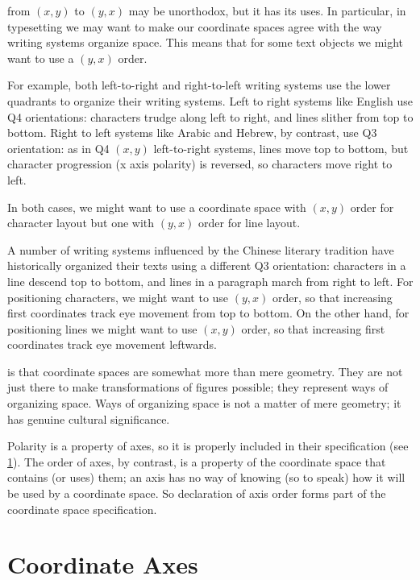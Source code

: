 \documentclass{tufte-handout}
\numberwithin{equation}{subsection}
\newcommand\cspace{coordinate space}
\begin{document}
 from \((x,y)\) to \((y,x)\) may
be unorthodox, but it has its uses.  In particular, in typesetting we
may want to make our \cspace{}s agree with the way writing systems
organize space.  This means that for some text objects we might want
to use a \((y,x)\) order.

For example, both left-to-right and right-to-left writing systems use
the lower quadrants to organize their writing systems.  Left to right
systems like English use Q4 orientations: characters trudge along left
to right, and lines slither from top to bottom.  Right to left systems
like Arabic and Hebrew, by contrast, use Q3 orientation: as in Q4
\((x,y)\) left-to-right systems, lines move top to bottom, but
character progression (x axis polarity) is reversed, so characters
move right to left.

In both cases, we might want to use a \cspace{} with \((x,y)\) order for
character layout but one with \((y,x)\) order for line layout.

A number of writing systems influenced by the Chinese literary
tradition have historically organized their texts using a different Q3
orientation: characters in a line descend top to bottom, and lines in
a paragraph march from right to left.  For positioning characters, we
might want to use \((y,x)\) order, so that increasing first
coordinates track eye movement from top to bottom.  On the other hand,
for positioning lines we might want to use \((x,y)\) order, so that
increasing first coordinates track eye movement leftwards.

 is that \cspace{}s are somewhat
more than mere geometry.  They are not just there to make
transformations of figures possible; they represent ways of organizing
space.  Ways of organizing space is not a matter of mere geometry; it
has genuine cultural significance.

Polarity is a property of axes, so it is properly included in their
specification (see \ref{sec:axes}).  The order of axes, by contrast,
is a property of the \cspace{} that contains (or uses) them; an axis has
no way of knowing (so to speak) how it will be used by a \cspace.  So
declaration of axis order forms part of the \cspace{} specification.

\section{Coordinate Axes}
\label{sec:axes}
\end{document}
